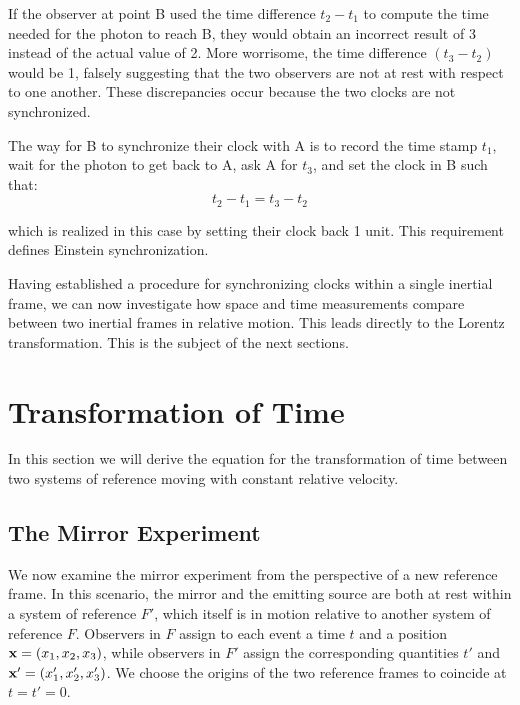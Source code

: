 \documentclass[12pt]{article}
\begin{document}
If the observer at point B used the time difference $t_2 - t_1$ to compute the time needed
for the photon to reach B, they would obtain an incorrect result of 3 instead of the actual
value of 2. More worrisome, the time difference $(t_3 - t_2)$ would be 1, falsely suggesting that the two 
observers are not at rest with respect to one another. These
discrepancies occur because the two clocks are not synchronized.

The way for B to synchronize their clock with A is to record the time stamp $t_1$, wait for
the photon to get back to A, ask A for $t_3$, and set the clock in B such that:
\begin{equation}
  t_2 - t_1 = t_3 - t_2
  \label{eq:clock_synchronization}
\end{equation}

which is realized in this case by setting their clock back 1 unit. This requirement defines Einstein synchronization.

Having established a procedure for synchronizing clocks within a single inertial frame, we can now 
investigate how space and time measurements compare between two 
inertial frames in relative motion. This leads directly to the Lorentz transformation. 
This is the subject of the next sections.

\section{Transformation of Time}

In this section we will derive the equation for the transformation of time between two
systems of reference moving with constant relative velocity. 

\subsection{The Mirror Experiment}

We now examine the mirror experiment from the perspective of a new reference frame. In this
scenario, the mirror and the emitting source are both at rest within a system of reference
$F'$, which itself is in motion relative to another system of reference $F$. Observers in $F$ assign to each event a time $t$ and a position
$\vb x=(x_1,x_2,x_3)$, while observers in $F'$ assign the corresponding
quantities $t'$ and $\vb x'=(x'_1,x'_2,x'_3)$. We choose the origins of the two reference frames to coincide at 
$t=t'=0$.
\end{document}
